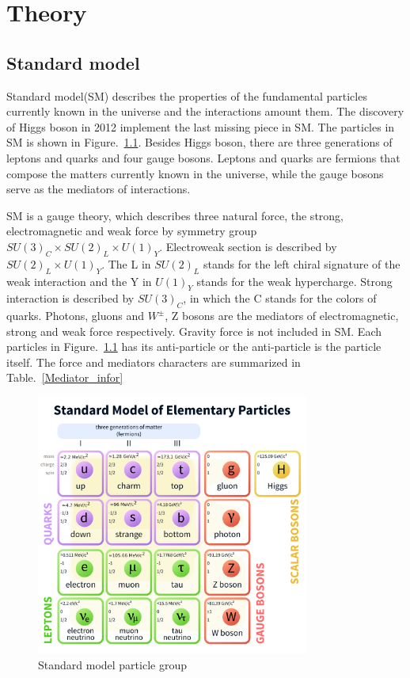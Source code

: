 
\chapter{Theory}

\section{Standard model}

Standard model(SM) describes the properties of the fundamental particles currently known in the universe and the interactions amount them.  The discovery of Higgs boson in 2012 implement the last missing piece in SM.  The particles in SM is shown in Figure.~\ref{fig:SM_particles}. Besides Higgs boson, there are three generations of leptons and quarks and four gauge bosons. 
Leptons and quarks are fermions that compose the matters currently known in the universe, while the gauge bosons serve as the mediators of interactions.  

SM is a gauge theory, which describes three natural force, the strong, electromagnetic and weak force by symmetry group $SU(3)_{C}\times SU(2)_{L}\times U(1)_{Y}$. Electroweak section is described by $SU(2)_{L}\times U(1)_{Y}$. The L in $SU(2)_{L}$ stands for the left chiral signature of the weak interaction and the Y in $U(1)_{Y}$ stands for the weak hypercharge. Strong interaction is described by $SU(3)_{C}$, in which the C stands for the colors of quarks.  Photons, gluons and $W^{\pm}$, Z bosons are the mediators of electromagnetic, strong and weak force respectively.  Gravity force is not included in SM. Each particles in Figure.~\ref{fig:SM_particles} has its anti-particle or the anti-particle is the particle itself. The force and mediators characters are summarized in Table.~\ref{Mediator_infor}

\begin{figure}[htbp] 
\centering
\includegraphics[width=0.8\textwidth]{chapter2/SM_particle_table.pdf}
\caption{Standard model particle group\cite{SM_particletable}}
\label{fig:SM_particles}
\end{figure}



